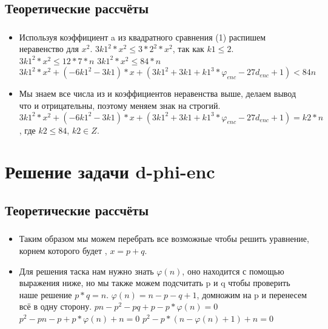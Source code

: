\documentclass[t]{beamer}
\begin{document}
\subsection{Теоретические рассчёты}
\begin{frame}[t] %
	\frametitle{\insertsection}
	\framesubtitle{\insertsubsection}
        \begin{itemize}
            \item Используя коэффициент a из квадратного сравнения (1) распишем неравенство для $x^2$.\newline
            $3k1^2*x^2 \leq 3*2^2*x^2$, так как $k1 \leq 2$.\newline
            $3k1^2*x^2 \leq 12*7*n$\newline
            $3k1^2*x^2 \leq 84*n$\newline
            $3k1^2*x^2+(-6k1^2-3k1)*x+(3k1^2+3k1+k1^3*\varphi_{enc}-27d_{enc}+1) < 84n$\newline
            \item Мы знаем все числа из  и  коэффициентов неравенства выше, делаем вывод что  и  отрицательны, поэтому меняем знак на строгий.\newline
            $3k1^2*x^2+(-6k1^2-3k1)*x+(3k1^2+3k1+k1^3*\varphi_{enc}-27d_{enc}+1)=k2*n$,
            где $k2 \leq 84$, $k2 \in Z$.
	\end{itemize}
\end{frame}

\section{Решение задачи d-phi-enc}
\subsection{Теоретические рассчёты}
\begin{frame}[t] %
	\frametitle{\insertsection}
	\framesubtitle{\insertsubsection}
        \begin{itemize}
            \item Таким образом мы можем перебрать все возможные  чтобы решить уравнение, корнем которого будет , $x=p+q$.
            \item Для решения таска нам нужно знать $\varphi(n)$, оно находится с помощью выражения ниже, но мы также можем подсчитать p и q чтобы проверить наше решение $p*q=n$.\newline
            $\varphi(n)=n-p-q+1$, домножим на p и перенесем всё в одну сторону.\newline\newline
            $pn-p^2-pq+p-p*\varphi(n)=0$\newline
            $p^2-pn-p+p*\varphi(n)+n=0$\newline
            $p^2-p*(n-\varphi(n)+1)+n=0$
	\end{itemize}
\end{frame}
\end{document}
